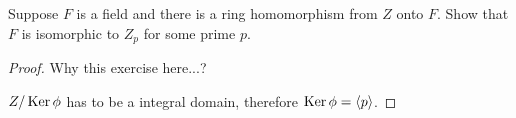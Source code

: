 \documentclass[../main.tex]{subfiles}
\begin{document}
\setcounter{exercise}{74}
\begin{exercise}
  Suppose $F$ is a field and there is a ring homomorphism from $Z$ onto $F$.
  Show that $F$ is isomorphic to $Z_p$ for some prime $p$.
\end{exercise}
\begin{proof}
  Why this exercise here...?

  $Z/\operatorname{Ker} \phi$ has to be a integral domain, therefore $\operatorname{Ker} \phi = \langle p \rangle$.
\end{proof}
\end{document}
